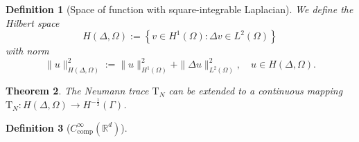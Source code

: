 \documentclass[10pt,journal,compsoc, onecolumn]{IEEEtran}
\newtheorem{theorem}{Theorem}[section]
\newtheorem{definition}[theorem]{Definition}
\begin{document}
\begin{definition}[Space of function with square-integrable Laplacian]
We define the Hilbert space
$$
H(\Delta, \Omega):=\left\{v \in H^{1}(\Omega): \Delta v \in L^{2}(\Omega)\right\}
$$
with norm
$$
\|u\|_{H(\Delta, \Omega)}^{2}:=\|u\|_{H^{1}(\Omega)}^{2}+\|\Delta u\|_{L^{2}(\Omega)}^{2}, \quad u \in H(\Delta, \Omega).
$$
\end{definition}

\begin{theorem}
The Neumann trace \(\mathrm{T}_{N}\) can be extended to a continuous mapping \(\mathrm{T}_{N}: H(\Delta, \Omega) \rightarrow H^{-\frac{1}{2}}(\Gamma)\).
\end{theorem}

\begin{definition}[\(C_{\mathrm{comp}}^{\infty}\left(\mathbb{R}^{d}\right)\)]

\end{definition}
\end{document}
